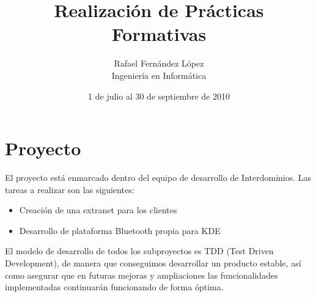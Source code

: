 \documentclass[12pt]{article}
\title{Realización de Prácticas Formativas}
\author{Rafael Fernández López\\Ingeniería en Informática}
\date{1 de julio al 30 de septiembre de 2010}
\begin{document}
  \maketitle
  \section{Proyecto}
    El proyecto está enmarcado dentro del equipo de desarrollo de Interdominios. Las tareas a
    realizar son las siguientes:
    \begin{itemize}
      \item Creación de una extranet para los clientes
      \item Desarrollo de plataforma Bluetooth propia para KDE
    \end{itemize}
    El modelo de desarrollo de todos los subproyectos es TDD (Test Driven Development), de manera
    que conseguimos desarrollar un producto estable, así como asegurar que en futuras mejoras y
    ampliaciones las funcionalidades implementadas continuarán funcionando de forma óptima.
\end{document}
